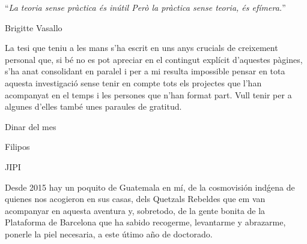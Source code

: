 \documentclass[
11pt, %
english, %
onehalfspacing %
]{MastersDoctoralThesis} %
\begin{document}
\noindent\enquote{\itshape La teoria sense pràctica és inútil
Però la pràctica sense teoria, és efímera.}\bigbreak

\hfill Brigitte Vasallo


\begin{abstract}
\addchaptertocentry{\abstractname} %

%

\end{abstract}


\begin{resum}
\addchaptertocentry{\resumname} %

%

\end{resum}


\begin{acknowledgements}
\addchaptertocentry{\acknowledgementname} %

La tesi que teniu a les mans s'ha escrit en uns anys crucials de creixement personal que, si bé no es pot apreciar en el contingut explícit d'aquestes pàgines, s'ha anat consolidant en paralel i per a mi resulta impossible pensar en tota aquesta investigació sense tenir en compte tots els projectes que l'han acompanyat en el temps i les persones que n'han format part. Vull tenir per a algunes d'elles també unes paraules de gratitud.

Dinar del mes

Filipos

JIPI



Desde 2015 hay un poquito de Guatemala en m\'i, de la cosmovisión ind\'gena de quienes nos acogieron en sus casas, dels Quetzals Rebeldes que em van acompanyar en aquesta aventura y, sobretodo, de la gente bonita de la Plataforma de Barcelona que ha sabido recogerme, levantarme y abrazarme, ponerle la piel necesaria, a este \'utimo año de doctorado.
%

\end{acknowledgements}
\end{document}
